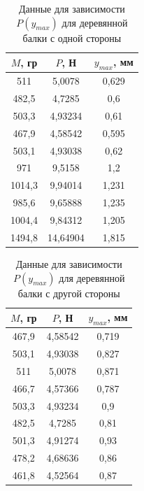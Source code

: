 \documentclass[a4paper]{article}
\begin{document}
\begin{table}[h!]
\begin{center}
\begin{tabular}{|c|c|c|}
\hline
$M$, гр & $P$, Н   & $y_{max}$, мм \\ \hline
511     & 5,0078   & 0,629         \\ \hline
482,5   & 4,7285   & 0,6           \\ \hline
503,3   & 4,93234  & 0,61          \\ \hline
467,9   & 4,58542  & 0,595         \\ \hline
503,1   & 4,93038  & 0,62          \\ \hline
971     & 9,5158   & 1,2           \\ \hline
1014,3  & 9,94014  & 1,231         \\ \hline
985,6   & 9,65888  & 1,235         \\ \hline
1004,4  & 9,84312  & 1,205         \\ \hline
1494,8  & 14,64904 & 1,815         \\ \hline
\end{tabular}
\caption{Данные для зависимости $P(y_{max})$ для деревянной балки с одной стороны}
\end{center}
\end{table}

\begin{table}[h!]
\begin{center}
\begin{tabular}{|c|c|c|}
\hline
$M$, гр & $P$, Н  & $y_{max}$, мм \\ \hline
467,9   & 4,58542 & 0,719         \\ \hline
503,1   & 4,93038 & 0,827         \\ \hline
511     & 5,0078  & 0,871         \\ \hline
466,7   & 4,57366 & 0,787         \\ \hline
503,3   & 4,93234 & 0,9           \\ \hline
482,5   & 4,7285  & 0,81          \\ \hline
501,3   & 4,91274 & 0,93          \\ \hline
478,2   & 4,68636 & 0,86          \\ \hline
461,8   & 4,52564 & 0,87          \\ \hline
\end{tabular}
\caption{Данные для зависимости $P(y_{max})$ для деревянной балки с другой стороны}
\end{center}
\end{table}
\end{document}
